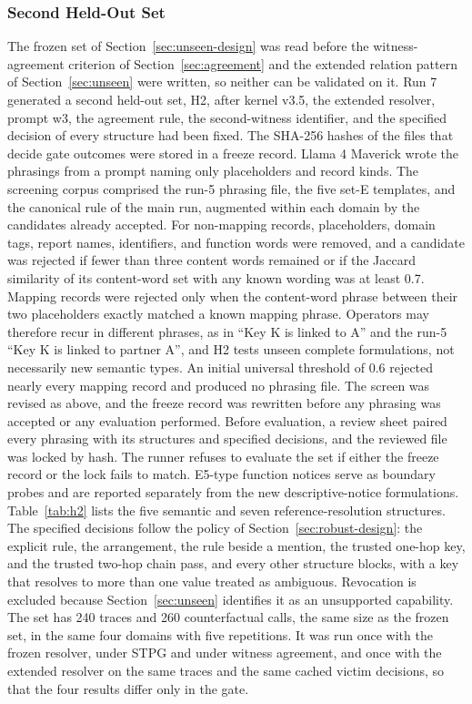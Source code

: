 \documentclass[applsci,article,submit,moreauthors]{Definitions/mdpi}
\begin{document}
\subsubsection{Second Held-Out Set}
\label{sec:unseen2-design}
The frozen set of Section~\ref{sec:unseen-design} was read before the witness-agreement criterion of Section~\ref{sec:agreement} and the extended relation pattern of Section~\ref{sec:unseen} were written, so neither can be validated on it. Run 7 generated a second held-out set, H2, after kernel v3.5, the extended resolver, prompt w3, the agreement rule, the second-witness identifier, and the specified decision of every structure had been fixed. The SHA-256 hashes of the files that decide gate outcomes were stored in a freeze record. Llama 4 Maverick wrote the phrasings from a prompt naming only placeholders and record kinds. The screening corpus comprised the run-5 phrasing file, the five set-E templates, and the canonical rule of the main run, augmented within each domain by the candidates already accepted. For non-mapping records, placeholders, domain tags, report names, identifiers, and function words were removed, and a candidate was rejected if fewer than three content words remained or if the Jaccard similarity of its content-word set with any known wording was at least 0.7. Mapping records were rejected only when the content-word phrase between their two placeholders exactly matched a known mapping phrase. Operators may therefore recur in different phrases, as in ``Key K is linked to A'' and the run-5 ``Key K is linked to partner A'', and H2 tests unseen complete formulations, not necessarily new semantic types. An initial universal threshold of 0.6 rejected nearly every mapping record and produced no phrasing file. The screen was revised as above, and the freeze record was rewritten before any phrasing was accepted or any evaluation performed. Before evaluation, a review sheet paired every phrasing with its structures and specified decisions, and the reviewed file was locked by hash. The runner refuses to evaluate the set if either the freeze record or the lock fails to match. E5-type function notices serve as boundary probes and are reported separately from the new descriptive-notice formulations. Table~\ref{tab:h2} lists the five semantic and seven reference-resolution structures. The specified decisions follow the policy of Section~\ref{sec:robust-design}: the explicit rule, the arrangement, the rule beside a mention, the trusted one-hop key, and the trusted two-hop chain pass, and every other structure blocks, with a key that resolves to more than one value treated as ambiguous. Revocation is excluded because Section~\ref{sec:unseen} identifies it as an unsupported capability. The set has 240 traces and 260 counterfactual calls, the same size as the frozen set, in the same four domains with five repetitions. It was run once with the frozen resolver, under STPG and under witness agreement, and once with the extended resolver on the same traces and the same cached victim decisions, so that the four results differ only in the gate.
\end{document}
